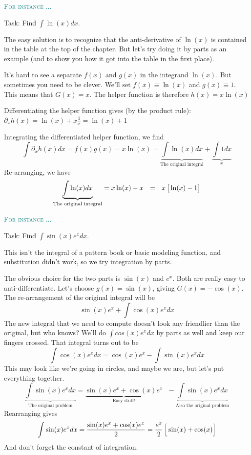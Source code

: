\documentclass[
  letterpaper,
  DIV=11,
  numbers=noendperiod,
  oneside]{scrreprt}
\newenvironment{example}%
{%
\textcolor{teal}{\hrulefill}%
  \par\vspace{.3\baselineskip}%
  \textcolor{teal}{\scshape For instance ...}%
  \par\vspace{\baselineskip}%
}%
{\textcolor{teal}{\hrulefill}}
\begin{document}
\begin{example}
Task: Find \(\int \ln(x) dx\).

The easy solution is to recognize that the anti-derivative of \(\ln(x)\)
is contained in the table at the top of the chapter. But let's try doing
it by parts as an example (and to show you how it got into the table in
the first place).

It's hard to see a separate \(f(x)\) and \(g(x)\) in the integrand
\(\ln(x)\). But sometimes you need to be clever. We'll set
\(f(x) \equiv \ln(x)\) and \(g(x) \equiv 1\). This means that
\(G(x) = x\). The helper function is therefore \(h(x) = x\ln(x)\)

Differentiating the helper function gives (by the product rule):
\(\partial_x h(x) = \ln(x) + x \frac{1}{x} = \ln(x) + 1\)

Integrating the differentiated helper function, we find
\[\int \partial_x h(x) dx = f(x)g(x) = x \ln(x) = \underbrace{\int \ln(x) dx}_\text{The original integral} + \underbrace{\int 1 dx}_{x}\]
Re-arranging, we have
\[\underbrace{\int \ln(x) dx}_\text{The original integral} = x \ln(x) - x\ \  =\ \  x\left[\strut \ln(x) - 1\right]\]

\end{example}

\begin{example}
Task: Find \(\int \sin(x) e^x dx\).

This isn't the integral of a pattern book or basic modeling function,
and substitution didn't work, so we try integration by parts.

The obvious choice for the two parts is \(\sin(x)\) and \(e^x\). Both
are really easy to anti-differentiate. Let's choose \(g(x) = \sin(x)\),
giving \(G(x) = -\cos(x)\). The re-arrangement of the original integral
will be \[\sin(x) e^x + \int \cos(x) e^x dx\] The new integral that we
need to compute doesn't look any friendlier than the original, but who
knows? We'll do \(\int cos(x) e^x dx\) by parts as well and keep our
fingers crossed. That integral turns out to be
\[\int \cos(x) e^x dx = \cos(x) e^x - \int \sin(x) e^x dx\] This may
look like we're going in circles, and maybe we are, but let's put
everything together.
\[\underbrace{\int \sin(x) e^x dx}_\text{The original problem} = \underbrace{\sin(x) e^x + \cos(x) e^x}_\text{Easy stuff!}\ \ \  - \underbrace{\int \sin(x) e^x dx}_\text{Also the original problem}\]
Rearranging gives
\[\int \sin(x) e^x dx = \frac{\sin(x) e^x + \cos(x) e^x}{2} = \frac{e^x}{2}\left[{\large\strut} \sin(x) + \cos(x)\right]\]
And don't forget the constant of integration.

\end{example}
\end{document}
